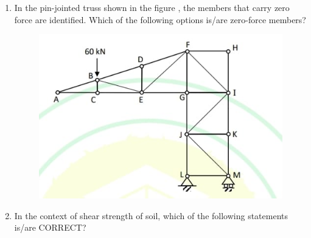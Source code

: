 \documentclass[journal,12pt,onecolumn]{article}
\theoremstyle{remark}
\begin{document}
\begin{enumerate}
    \hfill{}
    \begin{enumerate}
    \end{enumerate}

    \item In the pin-jointed truss shown in the figure , the members that carry zero force are identified. Which of the following options is/are zero-force members?
    \begin{figure}[H]
        \centering
        \includegraphics[width=0.7\columnwidth]{figs/2q-46.jpg}
        \caption{}
        \label{fig:q46}
    \end{figure}

    \hfill{}
    \begin{enumerate}
    \end{enumerate}

    \item In the context of shear strength of soil, which of the following statements is/are CORRECT?


\end{enumerate}
\end{document}
